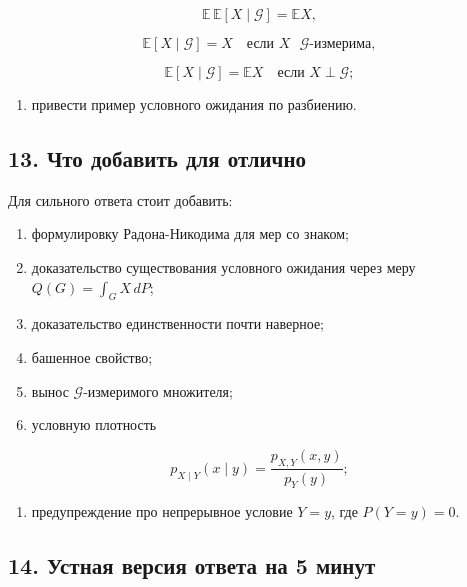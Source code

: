 \documentclass[
  11pt,
  a4paper,
]{article}
\providecommand{\tightlist}{%
  \setlength{\itemsep}{0pt}\setlength{\parskip}{0pt}}
\begin{document}
\[
\mathbb E\,\mathbb E[X\mid\mathcal G]=\mathbb EX,
\]

\[
\mathbb E[X\mid\mathcal G]=X
\quad\text{если }X\text{ }\mathcal G\text{-измерима},
\]

\[
\mathbb E[X\mid\mathcal G]=\mathbb EX
\quad\text{если }X\perp\mathcal G;
\]

\begin{enumerate}
\def\labelenumi{\arabic{enumi}.}
\setcounter{enumi}{4}
\tightlist
\item
  привести пример условного ожидания по разбиению.
\end{enumerate}

\subsection{13. Что добавить для
отлично}\label{ux447ux442ux43e-ux434ux43eux431ux430ux432ux438ux442ux44c-ux434ux43bux44f-ux43eux442ux43bux438ux447ux43dux43e}

Для сильного ответа стоит добавить:

\begin{enumerate}
\def\labelenumi{\arabic{enumi}.}
\tightlist
\item
  формулировку Радона-Никодима для мер со знаком;
\item
  доказательство существования условного ожидания через меру
  \(Q(G)=\int_GX\,dP\);
\item
  доказательство единственности почти наверное;
\item
  башенное свойство;
\item
  вынос \(\mathcal G\)-измеримого множителя;
\item
  условную плотность
\end{enumerate}

\[
p_{X\mid Y}(x\mid y)=\frac{p_{X,Y}(x,y)}{p_Y(y)};
\]

\begin{enumerate}
\def\labelenumi{\arabic{enumi}.}
\setcounter{enumi}{6}
\tightlist
\item
  предупреждение про непрерывное условие \(Y=y\), где \(P(Y=y)=0\).
\end{enumerate}

\subsection{14. Устная версия ответа на 5
минут}\label{ux443ux441ux442ux43dux430ux44f-ux432ux435ux440ux441ux438ux44f-ux43eux442ux432ux435ux442ux430-ux43dux430-5-ux43cux438ux43dux443ux442}
\end{document}
